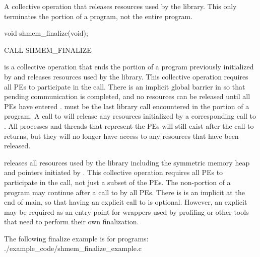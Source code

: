 \apisummary
{
    A collective operation that releases resources used by the \openshmem library.
    This only terminates the \openshmem portion of a program, not the entire
    program.
}

\begin{apidefinition}

\begin{Csynopsis}
void shmem_finalize(void);
\end{Csynopsis}

\begin{Fsynopsis}
CALL SHMEM_FINALIZE
\end{Fsynopsis}

\begin{apiarguments}
\end{apiarguments}

\apidescription
{
     is a collective operation that ends the \openshmem
    portion of a program previously initialized by  and
    releases resources used by the \openshmem library. This collective
    operation requires all \acp{PE} to participate in the call. There is an
    implicit global barrier in  so that pending
    communication is completed, and no resources can be released until all
    \acp{PE} have entered .  must be
    the last \openshmem library call encountered in the \openshmem portion of a
    program. A call to  will release any resources
    initialized by a corresponding call to . All processes and
    threads that represent the \acp{PE} will still exist after the call to
     returns, but they will no longer have access to any
    resources that have been released.
}


\apinotes
{
     releases all resources used by the \openshmem library
    including the symmetric memory heap and pointers initiated by
    . This collective operation requires all \acp{PE} to
    participate in the call, not just a subset of the \acp{PE}. The
    non-\openshmem portion of a program may continue after a call to
     by all \acp{PE}. There is is an implicit
     at the end of main, so that having an explicit call
    to  is optional. However, an explicit
     may be required as an entry point for wrappers used
    by profiling or other tools that need to perform their own finalization.
}

\begin{apiexamples}

\apicexample
    {The following finalize example is for \CorCpp{} programs:}
    {./example_code/shmem_finalize_example.c}
    {}

\end{apiexamples}

\end{apidefinition}
